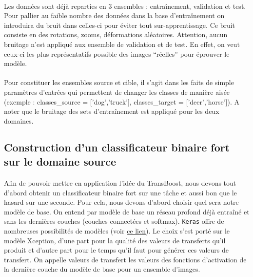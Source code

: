 \documentclass[11 pt]{article}
\begin{document}
\paragraph{}Les données sont déjà reparties en 3 ensembles : entraînement, validation et test. Pour pallier au faible nombre des données dans la base d’entraînement on introduira du bruit dans celles-ci pour éviter tout sur-apprentissage. Ce bruit consiste en des rotations, zooms, déformations aléatoires. Attention, aucun bruitage n’est appliqué aux ensemble de validation et de test. En effet, on veut ceux-ci les plus représentatifs possible des images “réelles” pour éprouver le modèle.

\paragraph{}Pour constituer les ensembles source et cible, il s’agit dans les faits de simple paramètres d’entrées qui permettent de changer les classes de manière aisée (exemple : classes\_source = ['dog','truck'], classes\_target = ['deer','horse']). A noter que le bruitage des sets d’entraînement est appliqué pour les deux domaines.


\subsection{Construction d'un classificateur binaire fort sur le domaine source}
\paragraph{}Afin de pouvoir mettre en application l’idée du TransBoost, nous devons tout d’abord obtenir un classificateur binaire fort sur une tâche et aussi bon que le hasard sur une seconde. Pour cela, nous devons d’abord choisir quel sera notre modèle de base. On entend par modèle de base un réseau profond déjà entraîné et sans les dernières couches (couches connectées et softmax). \texttt{Keras} offre de nombreuses possibilités de modèles (voir \href{https://keras.io/applications/}{ce lien}). Le choix s’est porté sur le modèle Xception, d’une part pour la qualité des valeurs de transferts qu’il produit et d’autre part pour le temps qu’il faut pour générer ces valeurs de transfert. On appelle valeurs de transfert les valeurs des fonctions d’activation de la dernière couche du modèle de base pour un ensemble d’images.
\end{document}
